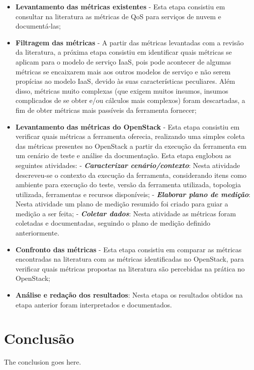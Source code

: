 \documentclass[conference]{IEEEtran}
\begin{document}
\begin{itemize}
 \item \textbf{Levantamento das métricas existentes} - Esta etapa consistiu em consultar na literatura as métricas de QoS para
	serviços de nuvem e documentá-las;
 \item \textbf{Filtragem das métricas} - A partir das métricas levantadas com a revisão da literatura, a próxima etapa consistiu em 
	identificar quais métricas se aplicam para o modelo de serviço IaaS, pois pode acontecer de algumas métricas se encaixarem
	mais aos outros modelos de serviço e não serem propícias ao modelo IaaS, devido às suas características peculiares. Além disso,
	métricas muito complexas (que exigem muitos insumos, insumos complicados de se obter e/ou cálculos mais complexos) foram descartadas,
	a fim de obter métricas mais passíveis da ferramenta fornecer;
 \item \textbf{Levantamento das métricas do OpenStack} - Esta etapa consistiu em verificar quais métricas a ferramenta oferecia,
	realizando uma simples coleta das métricas presentes no OpenStack a partir da execução da ferramenta em um cenário de teste 
	e análise da documentação.
	Esta etapa englobou as seguintes atividades:
	\subitem - \emph{\textbf{Caracterizar cenário/contexto}}: Nesta atividade descreveu-se o contexto da execução da ferramenta,
		 considerando itens como ambiente para execução do teste, versão da ferramenta utilizada, topologia utilizada, ferramentas
		 e recursos disponíveis;
	\subitem - \emph{\textbf{Elaborar plano de medição}}: Nesta atividade um plano de medição resumido foi criado para guiar a medição
		 a ser feita;
	\subitem - \emph{\textbf{Coletar dados}}: Nesta atividade as métricas foram coletadas e documentadas, seguindo o
		 plano de medição definido anteriormente.
 \item \textbf{Confronto das métricas} - Esta etapa consistiu em comparar as métricas encontradas na literatura com as métricas
	identificadas no OpenStack, para verificar quais métricas propostas na literatura são percebidas na prática no OpenStack;
 \item \textbf{Análise e redação dos resultados}: Nesta etapa os resultados obtidos na etapa anterior foram interpretados e documentados.
\end{itemize}


\section{Conclusão}
The conclusion goes here.
\end{document}
